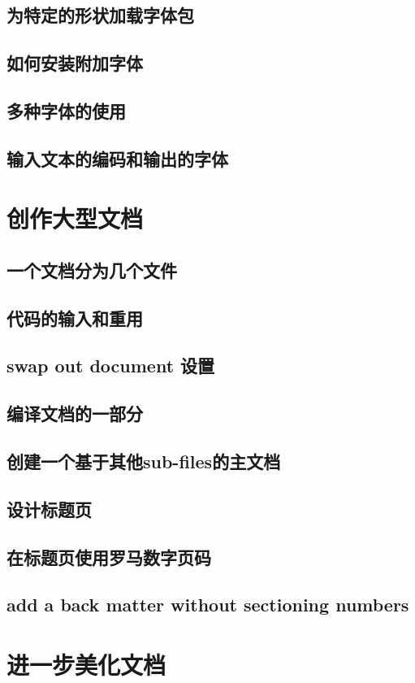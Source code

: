 \documentclass{book}
\begin{document}
	\section{为特定的形状加载字体包}
	\section{如何安装附加字体}
	\section{多种字体的使用}
	\section{输入文本的编码和输出的字体}
\chapter{创作大型文档}
	\section{一个文档分为几个文件}
	\section{代码的输入和重用}
	\section{swap out document 设置}
	\section{编译文档的一部分}
	\section{创建一个基于其他sub-files的主文档}
	\section{设计标题页}
	\section{在标题页使用罗马数字页码}
	\section{add a back matter without sectioning numbers}
\chapter{进一步美化文档}
\end{document}
